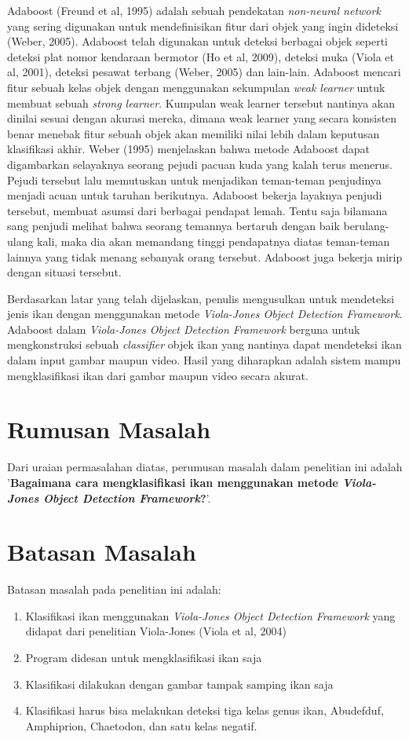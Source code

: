 Adaboost (Freund et al, 1995) adalah sebuah pendekatan \textit{non-neural network} 
yang sering digunakan untuk mendefinisikan fitur dari objek yang ingin 
dideteksi (Weber, 2005). Adaboost telah digunakan untuk deteksi berbagai objek 
seperti deteksi plat nomor kendaraan bermotor (Ho et al, 2009), deteksi muka 
(Viola et al, 2001), deteksi pesawat terbang (Weber, 2005) dan lain-lain. 
Adaboost mencari fitur sebuah kelas objek dengan menggunakan sekumpulan 
\emph{weak learner} untuk membuat sebuah \emph{strong learner}. 
Kumpulan weak learner tersebut nantinya akan dinilai sesuai dengan akurasi 
mereka, dimana weak learner yang secara konsisten benar menebak fitur sebuah 
objek akan memiliki nilai lebih dalam keputusan klasifikasi akhir. Weber (1995) 
menjelaskan bahwa metode Adaboost dapat digambarkan selayaknya seorang pejudi 
pacuan kuda yang kalah terus menerus. Pejudi tersebut lalu memutuskan untuk 
menjadikan teman-teman penjudinya menjadi acuan untuk taruhan berikutnya. 
Adaboost bekerja layaknya penjudi tersebut, membuat asumsi dari berbagai 
pendapat lemah. Tentu saja bilamana sang penjudi melihat bahwa seorang 
temannya bertaruh dengan baik berulang-ulang kali, maka dia akan 
memandang tinggi pendapatnya diatas teman-teman lainnya yang tidak menang 
sebanyak orang tersebut. Adaboost juga bekerja mirip dengan situasi tersebut.

Berdasarkan latar yang telah dijelaskan, penulis mengusulkan untuk mendeteksi 
jenis ikan dengan menggunakan metode \emph{Viola-Jones Object Detection Framework}. 
Adaboost dalam \emph{Viola-Jones Object Detection Framework} berguna untuk 
mengkonstruksi sebuah \emph{classifier} objek ikan yang nantinya dapat mendeteksi 
ikan dalam input gambar maupun video. Hasil yang diharapkan adalah sistem 
mampu mengklasifikasi ikan dari gambar maupun video secara akurat.

\section{Rumusan Masalah}
Dari uraian permasalahan diatas, perumusan masalah dalam penelitian ini adalah 
'\textbf{Bagaimana cara mengklasifikasi ikan menggunakan metode 
\textit{Viola-Jones Object Detection Framework}?}'.

\section{Batasan Masalah}
Batasan masalah pada penelitian ini adalah:
\begin{enumerate}
	\item Klasifikasi ikan menggunakan \textit{Viola-Jones Object Detection Framework} yang didapat dari penelitian Viola-Jones (Viola et al, 2004)
	\item Program didesan untuk mengklasifikasi ikan saja
	\item Klasifikasi dilakukan dengan gambar tampak samping ikan saja
	\item Klasifikasi harus bisa melakukan deteksi tiga kelas genus ikan, Abudefduf, Amphiprion, Chaetodon, 
	dan satu kelas negatif.
\end{enumerate}

